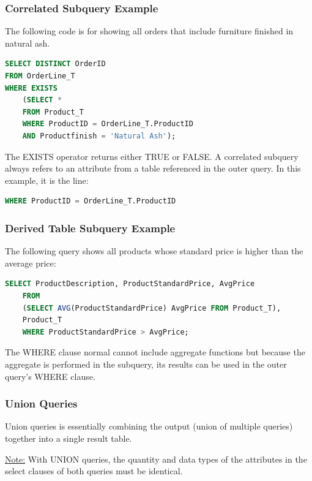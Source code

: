 \documentclass[12pt]{article}
\begin{document}
\subsubsection{Correlated Subquery Example}

The following code is for showing all orders that include furniture finished in natural ash.
\begin{lstlisting}[language=SQL]
SELECT DISTINCT OrderID
FROM OrderLine_T
WHERE EXISTS
	(SELECT *
	FROM Product_T
	WHERE ProductID = OrderLine_T.ProductID
	AND Productfinish = 'Natural Ash');
\end{lstlisting}

The EXISTS operator returns either TRUE or FALSE. A correlated subquery always refers to an attribute from a table referenced in the outer query. In this example, it is the line:

\begin{lstlisting}[language=SQL]
	WHERE ProductID = OrderLine_T.ProductID
\end{lstlisting}

\subsubsection{Derived Table Subquery Example}

The following query shows all products whose standard price is higher than the average price:

\begin{lstlisting}[language=SQL]
SELECT ProductDescription, ProductStandardPrice, AvgPrice
	FROM 
	(SELECT AVG(ProductStandardPrice) AvgPrice FROM Product_T),
	Product_T
	WHERE ProductStandardPrice > AvgPrice;
\end{lstlisting}

The WHERE clause normal cannot include aggregate functions but because the aggregate is performed in the subquery, its results can be used in the outer query's WHERE clause.

\subsubsection{Union Queries}

Union queries is essentially combining the output (union of multiple queries) together into a single result table.

\begin{tcolorbox}
	\underline{Note:} With UNION queries, the quantity and data types of the attributes in the select clauses of both queries must be identical.
\end{tcolorbox}
\end{document}

